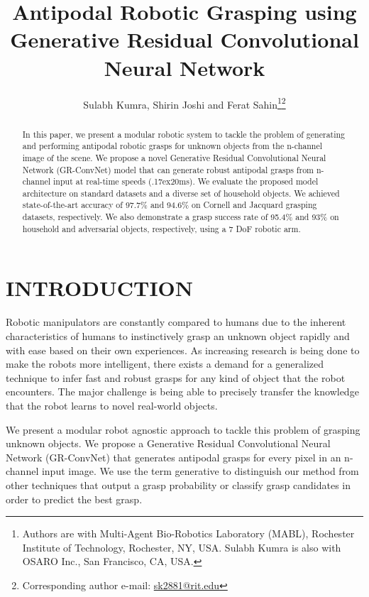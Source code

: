 \documentclass[letterpaper, 10pt, conference]{IEEEtran}
\begin{document}
\title{\LARGE \bf
Antipodal Robotic Grasping using \\ Generative Residual Convolutional Neural Network
}

\author{Sulabh Kumra, Shirin Joshi and Ferat Sahin\thanks{Authors are with Multi-Agent Bio-Robotics Laboratory (MABL), Rochester Institute of Technology, Rochester, NY, USA. Sulabh Kumra is also with OSARO Inc., San Francisco, CA, USA.}\thanks{Corresponding author e-mail: \href{mailto:sk2881@rit.edu}{sk2881@rit.edu}}
}

\maketitle



\begin{abstract}
In this paper, we present a modular robotic system to tackle the problem of generating and performing antipodal robotic grasps for unknown objects from the n-channel image of the scene. We propose a novel Generative Residual Convolutional Neural Network (GR-ConvNet) model that can generate robust antipodal grasps from n-channel input at real-time speeds ({\raise.17ex\hbox{}}20ms). We evaluate the proposed model architecture on standard datasets and a diverse set of household objects. We achieved state-of-the-art accuracy of 97.7\% and 94.6\% on Cornell and Jacquard grasping datasets, respectively. We also demonstrate a grasp success rate of 95.4\% and 93\% on household and adversarial objects, respectively, using a 7 DoF robotic arm.
\end{abstract}



\section{INTRODUCTION}
Robotic manipulators are constantly compared to humans due to the inherent characteristics of humans to instinctively grasp an unknown object rapidly and with ease based on their own experiences. As increasing research is being done to make the robots more intelligent, there exists a demand for a generalized technique to infer fast and robust grasps for any kind of object that the robot encounters. The major challenge is being able to precisely transfer the knowledge that the robot learns to novel real-world objects.

We present a modular robot agnostic approach to tackle this problem of grasping unknown objects. We propose a Generative Residual Convolutional Neural Network (GR-ConvNet) that generates antipodal grasps for every pixel in an n-channel input image. We use the term generative to distinguish our method from other techniques that output a grasp probability or classify grasp candidates in order to predict the best grasp.
\end{document}
